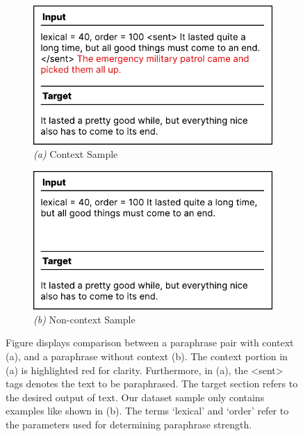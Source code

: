 \documentclass{l4proj}
\theoremstyle{definition}
\begin{document}
        \begin{figure}[h]
            \centering
            \captionsetup[subfigure]{labelformat=empty}
            \begin{subfigure}{.5\textwidth}
                \centering
                \includegraphics[width=.9\linewidth]{images/methods/kpar3-context-sample.pdf}
                \caption{\emph{(a)} Context Sample}
                \label{fig:kpar3-context}
            \end{subfigure}%
            \begin{subfigure}{.5\textwidth}
                \centering
                \includegraphics[width=0.9\linewidth]{images/methods/kpar3-non-context-sample.pdf}
                \caption{\emph{(b)} Non-context Sample}
                \label{fig:kpar3-non-context}
            \end{subfigure}
            \caption{Figure displays comparison between a paraphrase pair with context (a), and a paraphrase without context (b). The context portion in (a) is highlighted red for clarity. Furthermore, in (a), the <sent> tags denotes the text to be paraphrased. The target section refers to the desired output of text. Our dataset sample only contains examples like shown in (b). The terms `lexical' and `order' refer to the parameters used for determining paraphrase strength.}
            \label{fig:kpar3-sample-comparison}
        \end{figure}
        
\end{document}
